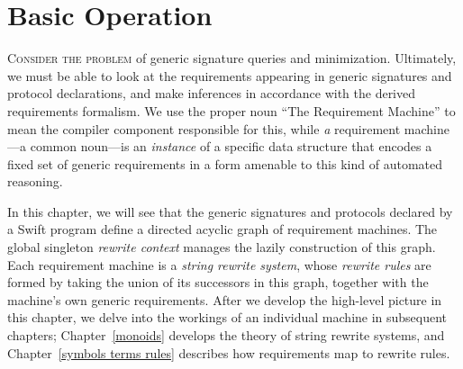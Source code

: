 \documentclass[../generics]{subfiles}
\begin{document}
\chapter{Basic Operation}\label{rqm basic operation}

\lettrine{C}{onsider the problem} of generic signature queries and minimization. Ultimately, we must be able to look at the requirements appearing in generic signatures and protocol declarations, and make inferences in accordance with the derived requirements formalism. We use the proper noun ``The Requirement Machine'' to mean the compiler component responsible for this, while \emph{a} requirement machine---a common noun---is an \emph{instance} of a specific data structure that encodes a fixed set of generic requirements in a form amenable to this kind of automated reasoning.

In this chapter, we will see that the generic signatures and protocols declared by a Swift program define a directed acyclic graph of requirement machines. The global singleton \emph{rewrite context} manages the lazily construction of this graph. Each requirement machine is a \emph{string rewrite system}, whose \emph{rewrite rules} are formed by taking the union of its successors in this graph, together with the machine's own generic requirements. After we develop the high-level picture in this chapter, we delve into the workings of an individual machine in subsequent chapters; Chapter~\ref{monoids} develops the theory of string rewrite systems, and Chapter~\ref{symbols terms rules} describes how requirements map to rewrite rules.

\smallskip
\end{document}
